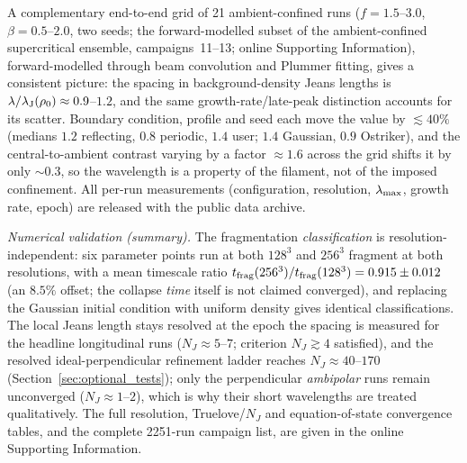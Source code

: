\documentclass[usenatbib,twoside,twocolumn]{mnras}
\begin{document}
A complementary end-to-end grid of 21 ambient-confined runs ($f=1.5$--$3.0$, $\beta=0.5$--$2.0$, two seeds; the forward-modelled subset of the ambient-confined supercritical ensemble, campaigns~11--13; online Supporting Information), forward-modelled through beam convolution and Plummer fitting, gives a consistent picture: the spacing in background-density Jeans lengths is $\lambda/\lambda_{\rm J}(\rho_0)\approx0.9$--$1.2$, and the same growth-rate/late-peak distinction accounts for its scatter. Boundary condition, profile and seed each move the value by $\lesssim40\%$ (medians $1.2$ reflecting, $0.8$ periodic, $1.4$ user; $1.4$ Gaussian, $0.9$ Ostriker), and the central-to-ambient contrast varying by a factor $\approx1.6$ across the grid shifts it by only $\sim0.3$, so the wavelength is a property of the filament, not of the imposed confinement. All per-run measurements (configuration, resolution, $\lambda_{\rm max}$, growth rate, epoch) are released with the public data archive.

\emph{Numerical validation (summary).}\label{sec:validation} The fragmentation \emph{classification} is resolution-independent: six parameter points run at both $128^3$ and $256^3$ fragment at both resolutions, with a mean timescale ratio $t_{\rm frag}(256^3)/t_{\rm frag}(128^3)=0.915\pm0.012$ (an $8.5\%$ offset; the collapse \emph{time} itself is not claimed converged), and replacing the Gaussian initial condition with uniform density gives identical classifications. The local Jeans length stays resolved at the epoch the spacing is measured for the headline longitudinal runs ($N_J\approx5$--$7$; \citet{Truelove1997} criterion $N_J\gtrsim4$ satisfied), and the resolved ideal-perpendicular refinement ladder reaches $N_J\approx40$--$170$ (Section~\ref{sec:optional_tests}); only the perpendicular \emph{ambipolar} runs remain unconverged ($N_J\approx1$--$2$), which is why their short wavelengths are treated qualitatively. The full resolution, Truelove/$N_J$ and equation-of-state convergence tables, and the complete 2251-run campaign list, are given in the online Supporting Information.



\end{document}
